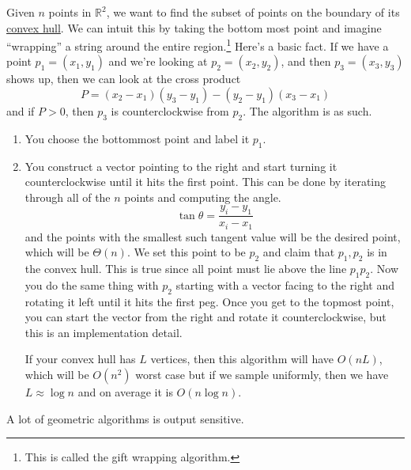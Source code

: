   \begin{example}
    \label{ex:gift-wrapping-a-convex-hull}
    Given $n$ points in $\mathbb{R}^2$, we want to find the subset of points on the boundary of its \hyperref[alg-def:convex-hull]{convex hull}. We can intuit this by taking the bottom most point and imagine ``wrapping'' a string around the entire region.\footnote{This is called the gift wrapping algorithm.} Here's a basic fact. If we have a point $p_1 = (x_1, y_1)$ and we're looking at $p_2 = (x_2, y_2)$, and then $p_3 = (x_3, y_3)$ shows up, then we can look at the cross product 
    \begin{equation}
      P = (x_2 - x_1) (y_3 - y_1) - (y_2 - y_1)(x_3 - x_1) 
    \end{equation}
    and if $P > 0$, then $p_3$ is counterclockwise from $p_2$. The algorithm is as such. 
    \begin{enumerate}
      \item You choose the bottommost point and label it $p_1$. 
      \item You construct a vector pointing to the right and start turning it counterclockwise until it hits the first point. This can be done by iterating through all of the $n$ points and computing the angle. 
        \begin{equation}
          \tan{ \theta} = \frac{y_i - y_1}{x_i - x_1}
        \end{equation}
      and the points with the smallest such tangent value will be the desired point, which will be $\Theta(n)$. We set this point to be $p_2$ and claim that $p_1, p_2$ is in the convex hull. This is true since all point must lie above the line $p_1 p_2$. Now you do the same thing with $p_2$ starting with a vector facing to the right and rotating it left until it hits the first peg. Once you get to the topmost point, you can start the vector from the right and rotate it counterclockwise, but this is an implementation detail. 

      If your convex hull has $L$ vertices, then this algorithm will have $O(n L)$, which will be $O(n^2)$ worst case but if we sample uniformly, then we have $L \approx \log{n}$ and on average it is $O(n \log{n})$. 
    \end{enumerate}
    A lot of geometric algorithms is output sensitive. 
  \end{example}

